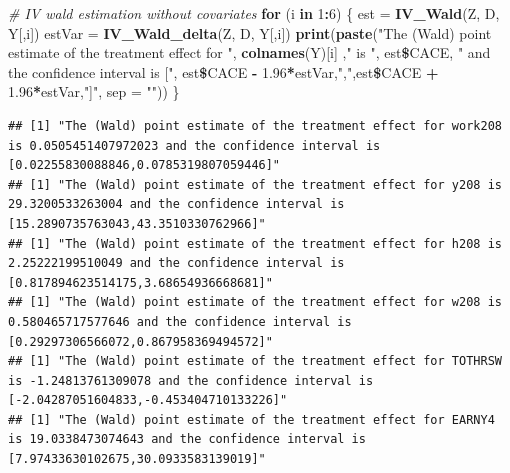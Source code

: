 \documentclass[]{article}
\newenvironment{Shaded}{\begin{snugshade}}{\end{snugshade}}
\newcommand{\KeywordTok}[1]{\textcolor[rgb]{0.13,0.29,0.53}{\textbf{#1}}}
\newcommand{\DataTypeTok}[1]{\textcolor[rgb]{0.13,0.29,0.53}{#1}}
\newcommand{\DecValTok}[1]{\textcolor[rgb]{0.00,0.00,0.81}{#1}}
\newcommand{\FloatTok}[1]{\textcolor[rgb]{0.00,0.00,0.81}{#1}}
\newcommand{\StringTok}[1]{\textcolor[rgb]{0.31,0.60,0.02}{#1}}
\newcommand{\CommentTok}[1]{\textcolor[rgb]{0.56,0.35,0.01}{\textit{#1}}}
\newcommand{\ControlFlowTok}[1]{\textcolor[rgb]{0.13,0.29,0.53}{\textbf{#1}}}
\newcommand{\OperatorTok}[1]{\textcolor[rgb]{0.81,0.36,0.00}{\textbf{#1}}}
\newcommand{\NormalTok}[1]{#1}
\begin{document}
\begin{Shaded}
\begin{Highlighting}[]
\CommentTok{# IV wald estimation without covariates}
\ControlFlowTok{for}\NormalTok{ (i }\ControlFlowTok{in} \DecValTok{1}\OperatorTok{:}\DecValTok{6}\NormalTok{)}
\NormalTok{\{}
\NormalTok{  est =}\StringTok{ }\KeywordTok{IV_Wald}\NormalTok{(Z, D, Y[,i])}
\NormalTok{  estVar =}\StringTok{ }\KeywordTok{IV_Wald_delta}\NormalTok{(Z, D, Y[,i])}
  \KeywordTok{print}\NormalTok{(}\KeywordTok{paste}\NormalTok{(}\StringTok{"The (Wald) point estimate of the treatment effect for "}\NormalTok{, }\KeywordTok{colnames}\NormalTok{(Y)[i] ,}\StringTok{" is "}\NormalTok{, est}\OperatorTok{\$}\NormalTok{CACE, }\StringTok{" and the confidence interval is ["}\NormalTok{, est}\OperatorTok{\$}\NormalTok{CACE }\OperatorTok{-}\StringTok{ }\FloatTok{1.96}\OperatorTok{*}\NormalTok{estVar,}\StringTok{","}\NormalTok{,est}\OperatorTok{\$}\NormalTok{CACE }\OperatorTok{+}\StringTok{ }\FloatTok{1.96}\OperatorTok{*}\NormalTok{estVar,}\StringTok{"]"}\NormalTok{, }\DataTypeTok{sep =} \StringTok{""}\NormalTok{))}
\NormalTok{\}}
\end{Highlighting}
\end{Shaded}

\begin{verbatim}
## [1] "The (Wald) point estimate of the treatment effect for work208 is 0.0505451407972023 and the confidence interval is [0.02255830088846,0.0785319807059446]"
## [1] "The (Wald) point estimate of the treatment effect for y208 is 29.3200533263004 and the confidence interval is [15.2890735763043,43.3510330762966]"
## [1] "The (Wald) point estimate of the treatment effect for h208 is 2.25222199510049 and the confidence interval is [0.817894623514175,3.68654936668681]"
## [1] "The (Wald) point estimate of the treatment effect for w208 is 0.580465717577646 and the confidence interval is [0.29297306566072,0.867958369494572]"
## [1] "The (Wald) point estimate of the treatment effect for TOTHRSW is -1.24813761309078 and the confidence interval is [-2.04287051604833,-0.453404710133226]"
## [1] "The (Wald) point estimate of the treatment effect for EARNY4 is 19.0338473074643 and the confidence interval is [7.97433630102675,30.0933583139019]"
\end{verbatim}
\end{document}
